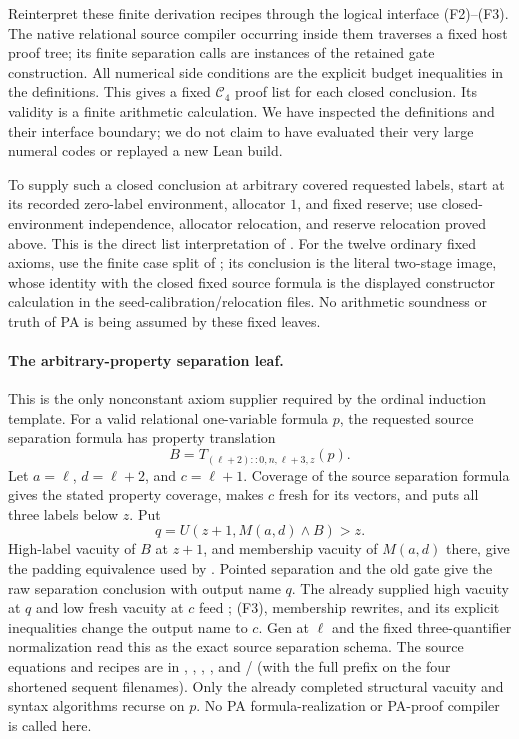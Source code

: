 Reinterpret these finite derivation recipes through the logical
interface (F2)--(F3).  The native relational source compiler occurring
inside them traverses a fixed host proof tree; its finite
separation calls are instances of the retained gate construction.
All numerical side conditions are the explicit budget inequalities
in the definitions.  This gives a fixed $\mathcal C_4$ proof list
for each closed conclusion.  Its validity is a finite arithmetic
calculation.  We have inspected the definitions and their interface
boundary; we do not claim to have evaluated their very large
numeral codes or replayed a new Lean build.

To supply such a closed conclusion at arbitrary covered requested
labels, start at its recorded zero-label environment, allocator $1$,
and fixed reserve; use closed-environment independence, allocator
relocation, and reserve relocation proved above.  This is the direct
list interpretation of
.
For the twelve ordinary fixed axioms, use the finite case split of
; its conclusion is the
literal two-stage  image, whose identity with
the closed fixed source formula is the displayed constructor
calculation in the seed-calibration/relocation files.  No arithmetic
soundness or truth of PA is being assumed by these fixed leaves.

\paragraph{The arbitrary-property separation leaf.}
This is the only nonconstant axiom supplier required by the ordinal
induction template.  For a valid relational one-variable formula
$p$, the requested source separation formula has property
translation
\[
 B=T_{(\ell+2)::0,n,\ell+3,z}(p).
\]
Let $a=\ell$, $d=\ell+2$, and $c=\ell+1$.  Coverage of the source
separation formula gives the stated property coverage, makes $c$
fresh for its vectors, and puts all three labels below $z$.
Put
\[
 q=U(z+1,M(a,d)\wedge B)>z.
 \tag{F8}
\]
High-label vacuity of $B$ at $z+1$, and membership vacuity of
$M(a,d)$ there, give the padding equivalence used by
.  Pointed separation and the old gate
give the raw separation conclusion with output name $q$.
The already supplied high vacuity at $q$ and low fresh vacuity at
$c$ feed ; (F3), membership rewrites,
and its explicit inequalities change the output name to $c$.
Gen at $\ell$ and the fixed three-quantifier normalization read this
as the exact source separation schema.  The source equations and
recipes are in
,
, ,
, and
/
(with the full prefix on the four shortened sequent filenames).
Only the already completed structural vacuity and syntax algorithms
recurse on $p$.  No PA formula-realization or PA-proof compiler is
called here.

